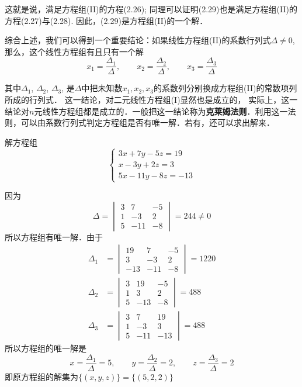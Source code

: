 这就是说，满足方程组(II)的方程(2.26); 同理可以证明(2.29)也是满足方程组(II)的方程(2.27)与(2.28). 因此，(2.29)是方程组(II)的一个解．

综合上述，我们可以得到一个重要结论：如果线性方程组(II)的系数行列式$\Delta\ne 0$, 那么，这个线性方程组有且只有一个解
\[x_1=\frac{\Delta_1}{\Delta},\qquad x_2=\frac{\Delta_2}{\Delta},\qquad x_3=\frac{\Delta_3}{\Delta}\]

其中$\Delta_1$, $\Delta_2$, $\Delta_3$, 是$\Delta$中把未知数$x_1,x_2,x_3$的系数列分别换成方程组(II)的常数项列所成的行列式．
这一结论，对二元线性方程组(I)显然也是成立的，
实际上，这一结论对$n$元线性方程组都是成立的．一般把这一结论称为\textbf{克莱姆法则}．利用这一法则，可以由系数行列式判定方程组是否有唯一解．若有，还可以求出解来．


\begin{example}
    解方程组
\[\begin{cases}
    3 x+7 y-5 z=19 \\
x-3 y+2 z=3 \\
5 x-11 y-8 z=-13
\end{cases}\]
\end{example}

\begin{solution}
    因为
    \[\Delta=\begin{vmatrix}
        3 & 7 & -5 \\
        1 & -3 & 2 \\
        5 & -11 & -8
        \end{vmatrix}=244 \ne 0\]
        所以方程组有唯一解．由于
\[\begin{split}
\Delta_{1}&=\begin{vmatrix}
    19 & 7 & -5 \\
3 & -3 & 2 \\
-13 & -11 & -8
\end{vmatrix}=1220\\
\Delta_{2}&=\begin{vmatrix}
    3 & 19 & -5 \\
1 & 3 & 2 \\
5 & -13 & -8
\end{vmatrix}=488\\
\Delta_{3}&=\begin{vmatrix}
    3 & 7 & 19 \\
1 & -3 & 3 \\
5 & -11 & -13
\end{vmatrix}=488
\end{split}\]
所以方程组的唯一解是
$$
x=\frac{\Delta_{1}}{\Delta}=5, \qquad y=\frac{\Delta_{2}}{\Delta}=2, \qquad z=\frac{\Delta_{3}}{\Delta}=2
$$
即原方程组的解集为$\{(x, y, z)\}=\{(5,2,2)\}$
\end{solution}

